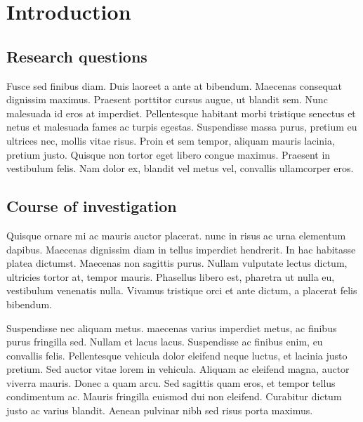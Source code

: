 \documentclass[draft=false
              ,paper=a4
              ,twoside=false
              ,fontsize=12pt
              ,headsepline
              ,BCOR10mm
              ,DIV11
              ]{article}
\begin{document}



\tableofcontents
{}
\listoffigures
{}
\listoftables
{}

\section{Introduction}
\vspace{6pt}
\subsection{Research questions}
\vspace{6pt}

Fusce sed finibus diam. Duis laoreet a ante at bibendum. Maecenas consequat dignissim maximus. Praesent porttitor cursus augue, ut blandit sem. Nunc malesuada id eros at imperdiet. Pellentesque habitant morbi tristique senectus et netus et malesuada fames ac turpis egestas. Suspendisse massa purus, pretium eu ultrices nec, mollis vitae risus. Proin et sem tempor, aliquam mauris lacinia, pretium justo. Quisque non tortor eget libero congue maximus. Praesent in vestibulum felis. Nam dolor ex, blandit vel metus vel, convallis ullamcorper eros.


\vspace{12pt}
\subsection{Course of investigation}
\vspace{6pt}

Quisque ornare mi ac mauris auctor placerat. nunc in risus ac urna elementum dapibus. Maecenas dignissim diam in tellus imperdiet hendrerit. In hac habitasse platea dictumst. Maecenas non sagittis purus. Nullam vulputate lectus dictum, ultricies tortor at, tempor mauris. Phasellus libero est, pharetra ut nulla eu, vestibulum venenatis nulla. Vivamus tristique orci et ante dictum, a placerat felis bibendum.

Suspendisse nec aliquam metus. maecenas varius imperdiet metus, ac finibus purus fringilla sed. Nullam et lacus lacus. Suspendisse ac finibus enim, eu convallis felis. Pellentesque vehicula dolor eleifend neque luctus, et lacinia justo pretium. Sed auctor vitae lorem in vehicula. Aliquam ac eleifend magna, auctor viverra mauris. Donec a quam arcu. Sed sagittis quam eros, et tempor tellus condimentum ac. Mauris fringilla euismod dui non eleifend. Curabitur dictum justo ac varius blandit. Aenean pulvinar nibh sed risus porta maximus.
\end{document}
